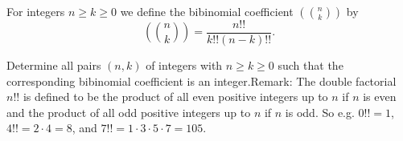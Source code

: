 For integers $n \ge k \ge 0$ we define the bibinomial coefficient $\left( \binom{n}{k} \right)$ by\[ \left( \binom{n}{k} \right) = \frac{n!!}{k!!(n-k)!!} .\]

Determine all pairs $(n,k)$ of integers with $n \ge k \ge 0$ such that the corresponding bibinomial coefficient is an integer.Remark: The double factorial $n!!$ is defined to be the product of all even positive integers up to $n$ if $n$ is even and the product of all odd positive integers up to $n$ if $n$ is odd. So e.g. $0!! = 1$,  $4!! = 2 \cdot 4 = 8$,  and $7!! = 1 \cdot 3 \cdot 5 \cdot 7 = 105$.